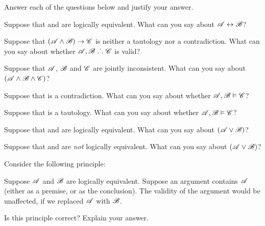 \solutions
\problempart
\label{pr.TT.concepts}
Answer each of the questions below and justify your answer.
\begin{earg}
\item Suppose that  and  are logically equivalent. What can you say about $\mathscr{A}\leftrightarrow\mathscr{B}$?
\item Suppose that $(\mathscr{A}\wedge\mathscr{B})\rightarrow\mathscr{C}$ is neither a tautology nor a contradiction. What can you say about whether $\mathscr{A}, \mathscr{B} \mathrel{\ldotp\dot{}\,\ldotp}\mathscr{C}$ is valid?
\item Suppose that $\mathscr{A}$, $\mathscr{B}$ and $\mathscr{C}$  are jointly inconsistent. What can you say about $(\mathscr{A}\wedge\mathscr{B}\wedge\mathscr{C})$?
\item Suppose that  is a contradiction. What can you say about whether $\mathscr{A}, \mathscr{B} \vDash \mathscr{C}$?
\item Suppose that  is a tautology. What can you say about whether $\mathscr{A}, \mathscr{B}\vDash \mathscr{C}$?
\item Suppose that  and  are logically equivalent. What can you say about $(\mathscr{A}\vee\mathscr{B})$?
\item Suppose that  and  are \emph{not} logically equivalent. What can you say about $(\mathscr{A}\vee\mathscr{B})$?
\end{earg}
\problempart 
Consider the following principle:
	\begin{ebullet}
		\item Suppose $\mathscr{A}$ and $\mathscr{B}$ are logically equivalent. Suppose an argument contains $\mathscr{A}$ (either as a premise, or as the conclusion). The validity of the argument would be unaffected, if we replaced $\mathscr{A}$ with $\mathscr{B}$.
	\end{ebullet}
Is this principle correct? Explain your answer.



